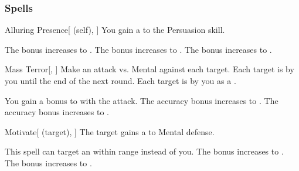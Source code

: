 \subsubsection{Spells}


\lowercase{\hypertarget{spell:Alluring Presence}{}}\label{spell:Alluring Presence}
\begin{attuneability}[Rank 1]{\hypertarget{spell:Alluring Presence}{Alluring Presence}}[ (self), ]
You gain a   to the Persuasion skill.

\rankline
{} The bonus increases to .
 The bonus increases to .
 The bonus increases to .

\end{attuneability}
\vspace{0.25em}



\lowercase{\hypertarget{spell:Mass Terror}{}}\label{spell:Mass Terror}
\begin{freeability}[Rank 1]{\hypertarget{spell:Mass Terror}{Mass Terror}}[, ]
Make an attack vs. Mental against each target.
\hit Each target is  by you until the end of the next round.
\crit Each target is  by you as a .

\rankline
{} You gain a  bonus to  with the attack.
 The accuracy bonus increases to .
 The accuracy bonus increases to .

\end{freeability}
\vspace{0.25em}



\lowercase{\hypertarget{spell:Motivate}{}}\label{spell:Motivate}
\begin{attuneability}[Rank 1]{\hypertarget{spell:Motivate}{Motivate}}[ (target), ]
The target gains a   to Mental defense.

\rankline
{} This spell can target an  within \rngmed range instead of you.
 The bonus increases to .
 The bonus increases to .

\end{attuneability}
\vspace{0.25em}



